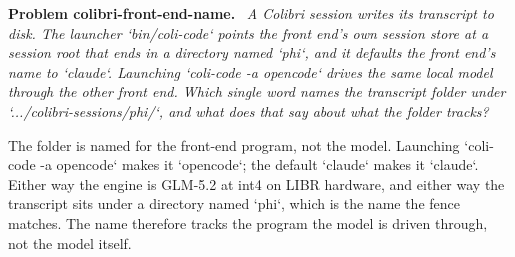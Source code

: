 \documentclass[11pt]{article}
\newenvironment{problem}[1]
  {\par\medskip\noindent\textbf{Problem #1.}\ \itshape}
  {\par\medskip}
\begin{document}
\begin{problem}{colibri-front-end-name}
A Colibri session writes its transcript to disk. The launcher `bin/coli-code` points the front end's own session store at a session root that ends in a directory named `phi`, and it defaults the front end's name to `claude`. Launching `coli-code -a opencode` drives the same local model through the other front end. Which single word names the transcript folder under `.../colibri-sessions/phi/`, and what does that say about what the folder tracks?
\end{problem}
The folder is named for the front-end program, not the model. Launching `coli-code -a opencode` makes it `opencode`; the default `claude` makes it `claude`. Either way the engine is GLM-5.2 at int4 on LIBR hardware, and either way the transcript sits under a directory named `phi`, which is the name the fence matches. The name therefore tracks the program the model is driven through, not the model itself.
\end{document}
